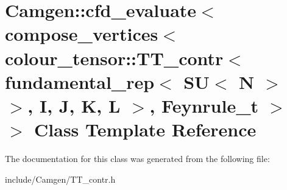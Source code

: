 \hypertarget{a00056}{}\section{Camgen\+:\+:cfd\+\_\+evaluate$<$ compose\+\_\+vertices$<$ colour\+\_\+tensor\+:\+:T\+T\+\_\+contr$<$ fundamental\+\_\+rep$<$ S\+U$<$ N $>$ $>$, I, J, K, L $>$, Feynrule\+\_\+t $>$ $>$ Class Template Reference}
\label{a00056}


The documentation for this class was generated from the following file\+:\begin{DoxyCompactItemize}
\item 
include/\+Camgen/T\+T\+\_\+contr.\+h\end{DoxyCompactItemize}
